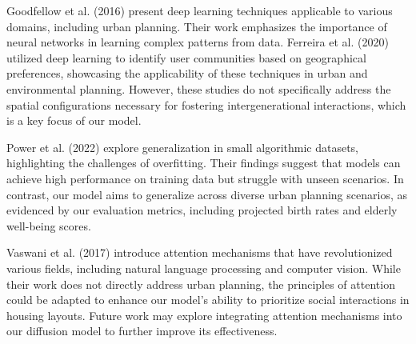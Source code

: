 \documentclass{article} %
\begin{document}
Goodfellow et al. (2016) present deep learning techniques applicable to various domains, including urban planning. Their work emphasizes the importance of neural networks in learning complex patterns from data. Ferreira et al. (2020) utilized deep learning to identify user communities based on geographical preferences, showcasing the applicability of these techniques in urban and environmental planning. However, these studies do not specifically address the spatial configurations necessary for fostering intergenerational interactions, which is a key focus of our model.

Power et al. (2022) explore generalization in small algorithmic datasets, highlighting the challenges of overfitting. Their findings suggest that models can achieve high performance on training data but struggle with unseen scenarios. In contrast, our model aims to generalize across diverse urban planning scenarios, as evidenced by our evaluation metrics, including projected birth rates and elderly well-being scores.

Vaswani et al. (2017) introduce attention mechanisms that have revolutionized various fields, including natural language processing and computer vision. While their work does not directly address urban planning, the principles of attention could be adapted to enhance our model's ability to prioritize social interactions in housing layouts. Future work may explore integrating attention mechanisms into our diffusion model to further improve its effectiveness.

\end{document}

